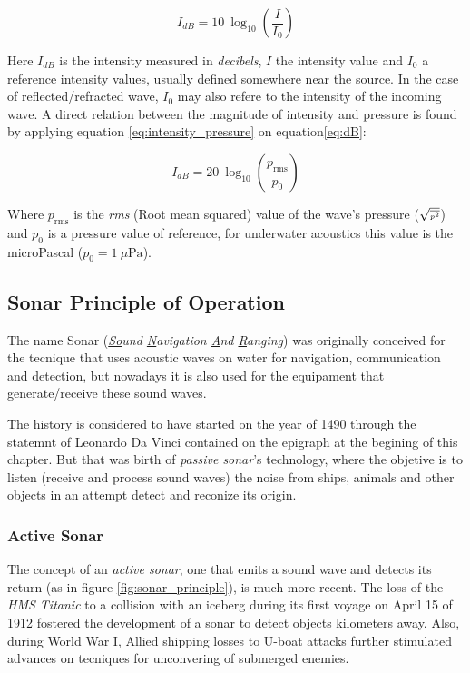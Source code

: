 \begin{equation}\label{eq:dB}
I_{dB} = 10~\log_{10}\left(\frac{I}{I_0}\right)
\end{equation} 

Here $I_{dB}$ is the intensity measured in \textit{decibels}, $I$ the intensity
value and $I_0$ a reference intensity values, usually defined somewhere near the
source. In the case of reflected/refracted wave, $I_0$ may also refere to
the intensity of the incoming wave. A direct relation between the magnitude of
intensity and pressure is found by applying equation \ref{eq:intensity_pressure}
on equation\ref{eq:dB}:

\begin{equation}\label{eq:dB}
I_{dB} = 20~\log_{10}\left(\frac{p_{\text{rms}}}{p_0}\right)
\end{equation}

Where $p_{\text{rms}}$ is the \textit{rms} (Root mean squared) value of the
wave's pressure ({\small $\sqrt{\text{\tiny \(\overline{p^2}\)}}$}) and $p_0$ is
a pressure value of reference, for underwater acoustics this value is the
microPascal (\(p_0 = 1~\mu\text{Pa} \))\cite{LURTON}.


\subsection{Sonar Principle of Operation}

The name Sonar (\textit{\underline{So}und \underline{N}avigation \underline{A}nd
\underline{R}anging}) was originally conceived for the tecnique that uses
acoustic waves on water for navigation, communication and detection, but
nowadays it is also used for the equipament that generate/receive these
sound waves.

The history is considered to have started on the year of 1490 through the
statemnt of Leonardo Da Vinci contained on the epigraph at the begining of this
chapter\cite{fahy1998fundamentals}. But that was birth of \textit{passive
sonar}'s technology, where the objetive is to listen (receive and process sound
waves) the noise from ships, animals and other objects in an attempt detect and
reconize its origin.

\subsubsection{Active Sonar}

The concept of an \textit{active sonar}, one that emits a sound wave and detects
its return (as in figure \ref{fig:sonar_principle}), is much more recent. The
loss of the \textit{HMS Titanic} to a collision with an iceberg during its first
voyage on April 15 of 1912 \cite{histsonar} fostered the development of a sonar
to detect objects kilometers away. Also, during World War I,
Allied shipping losses to U-boat attacks further stimulated advances on tecniques for
unconvering of submerged enemies.

